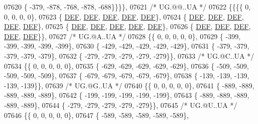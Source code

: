 \begin{DoxyCode}
07620 \{ -379, -878, -768, -878, -688\}\}\}\},
07621 \textcolor{comment}{/* UG.@@..UA */}
07622 \{\{\{\{    0,    0,    0,    0,    0\},
07623 \{  \mbox{\hyperlink{1_88_84__epars_8h_a397419fc12b37ed479c8abb9d444d843}{DEF}},  \mbox{\hyperlink{1_88_84__epars_8h_a397419fc12b37ed479c8abb9d444d843}{DEF}},  \mbox{\hyperlink{1_88_84__epars_8h_a397419fc12b37ed479c8abb9d444d843}{DEF}},  \mbox{\hyperlink{1_88_84__epars_8h_a397419fc12b37ed479c8abb9d444d843}{DEF}},  \mbox{\hyperlink{1_88_84__epars_8h_a397419fc12b37ed479c8abb9d444d843}{DEF}}\},
07624 \{  \mbox{\hyperlink{1_88_84__epars_8h_a397419fc12b37ed479c8abb9d444d843}{DEF}},  \mbox{\hyperlink{1_88_84__epars_8h_a397419fc12b37ed479c8abb9d444d843}{DEF}},  \mbox{\hyperlink{1_88_84__epars_8h_a397419fc12b37ed479c8abb9d444d843}{DEF}},  \mbox{\hyperlink{1_88_84__epars_8h_a397419fc12b37ed479c8abb9d444d843}{DEF}},  \mbox{\hyperlink{1_88_84__epars_8h_a397419fc12b37ed479c8abb9d444d843}{DEF}}\},
07625 \{  \mbox{\hyperlink{1_88_84__epars_8h_a397419fc12b37ed479c8abb9d444d843}{DEF}},  \mbox{\hyperlink{1_88_84__epars_8h_a397419fc12b37ed479c8abb9d444d843}{DEF}},  \mbox{\hyperlink{1_88_84__epars_8h_a397419fc12b37ed479c8abb9d444d843}{DEF}},  \mbox{\hyperlink{1_88_84__epars_8h_a397419fc12b37ed479c8abb9d444d843}{DEF}},  \mbox{\hyperlink{1_88_84__epars_8h_a397419fc12b37ed479c8abb9d444d843}{DEF}}\},
07626 \{  \mbox{\hyperlink{1_88_84__epars_8h_a397419fc12b37ed479c8abb9d444d843}{DEF}},  \mbox{\hyperlink{1_88_84__epars_8h_a397419fc12b37ed479c8abb9d444d843}{DEF}},  \mbox{\hyperlink{1_88_84__epars_8h_a397419fc12b37ed479c8abb9d444d843}{DEF}},  \mbox{\hyperlink{1_88_84__epars_8h_a397419fc12b37ed479c8abb9d444d843}{DEF}},  \mbox{\hyperlink{1_88_84__epars_8h_a397419fc12b37ed479c8abb9d444d843}{DEF}}\}\},
07627 \textcolor{comment}{/* UG.@A..UA */}
07628 \{\{    0,    0,    0,    0,    0\},
07629 \{ -399, -399, -399, -399, -399\},
07630 \{ -429, -429, -429, -429, -429\},
07631 \{ -379, -379, -379, -379, -379\},
07632 \{ -279, -279, -279, -279, -279\}\},
07633 \textcolor{comment}{/* UG.@C..UA */}
07634 \{\{    0,    0,    0,    0,    0\},
07635 \{ -629, -629, -629, -629, -629\},
07636 \{ -509, -509, -509, -509, -509\},
07637 \{ -679, -679, -679, -679, -679\},
07638 \{ -139, -139, -139, -139, -139\}\},
07639 \textcolor{comment}{/* UG.@G..UA */}
07640 \{\{    0,    0,    0,    0,    0\},
07641 \{ -889, -889, -889, -889, -889\},
07642 \{ -199, -199, -199, -199, -199\},
07643 \{ -889, -889, -889, -889, -889\},
07644 \{ -279, -279, -279, -279, -279\}\},
07645 \textcolor{comment}{/* UG.@U..UA */}
07646 \{\{    0,    0,    0,    0,    0\},
07647 \{ -589, -589, -589, -589, -589\},

\end{DoxyCode}
